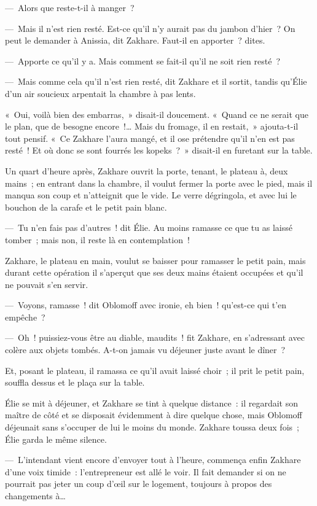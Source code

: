 \documentclass[french,twoside]{book} %
\begin{document}
— Alors que reste-t-il à manger ?\par
— Mais il n’est rien resté. Est-ce qu’il n’y aurait pas du jambon d’hier ? On peut le demander à Anissia, dit Zakhare. Faut-il en apporter ? dites.\par
— Apporte ce qu’il y a. Mais comment se fait-il qu’il ne soit rien resté ?\par
— Mais comme cela qu’il n’est rien resté, dit Zakhare et il sortit, tandis qu’Élie d’un air soucieux arpentait la chambre à pas lents.\par
« Oui, voilà bien des embarras, » disait-il doucement. « Quand ce ne serait que le plan, que de besogne encore !… Mais du fromage, il en restait, » ajouta-t-il tout pensif. « Ce Zakhare l’aura mangé, et il ose prétendre qu’il n’en est pas resté ! Et où donc se sont fourrés les kopeks ? » disait-il en furetant sur la table.\par
Un quart d’heure après, Zakhare ouvrit la porte, tenant, le plateau à, deux mains ; en entrant dans la chambre, il voulut fermer la porte avec le pied, mais il manqua son coup et n’atteignit que le vide. Le verre dégringola, et avec lui le bouchon de la carafe et le petit pain blanc.\par
— Tu n’en fais pas d’autres ! dit Élie. Au moins ramasse ce que tu as laissé tomber ; mais non, il reste là en contemplation !\par
Zakhare, le plateau en main, voulut se baisser pour ramasser le petit pain, mais durant cette opération il s’aperçut que ses deux mains étaient occupées et qu’il ne pouvait s’en servir.\par
— Voyons, ramasse ! dit Oblomoff avec ironie, eh bien ! qu’est-ce qui t’en empêche ?\par
— Oh ! puissiez-vous être au diable, maudits ! fit Zakhare, en s’adressant avec colère aux objets tombés. A-t-on jamais vu déjeuner juste avant le dîner ?\par
Et, posant le plateau, il ramassa ce qu’il avait laissé choir ; il prit le petit pain, souffla dessus et le plaça sur la table.\par
Élie se mit à déjeuner, et Zakhare se tint à quelque distance : il regardait son maître de côté et se disposait évidemment à dire quelque chose, mais Oblomoff déjeunait sans s’occuper de lui le moins du monde. Zakhare toussa deux fois ; Élie garda le même silence.\par
— L’intendant vient encore d’envoyer tout à l’heure, commença enfin Zakhare d’une voix timide : l’entrepreneur est allé le voir. Il fait demander si on ne pourrait pas jeter un coup d’œil sur le logement, toujours à propos des changements à…\par
\end{document}
